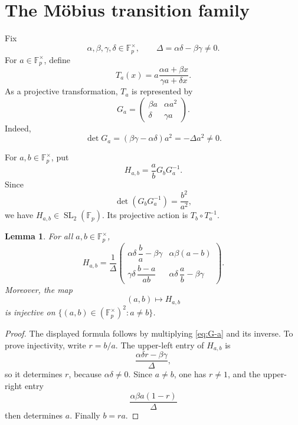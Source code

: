 \documentclass[11pt,reqno]{amsart}
\numberwithin{equation}{section}
\newtheorem{lemma}[lemma]{Lemma}
\theoremstyle{definition}
\theoremstyle{remark}
\newcommand{\F}{\mathbb F}
\newcommand{\SL}{\operatorname{SL}}
\begin{document}
\section{The M\"obius transition family}\label{sec:transitions}

Fix
\begin{equation}\label{eq:coeff-assumptions}
  \alpha,\beta,\gamma,\delta\in\F_p^\times,
  \qquad
  \Delta=\alpha\delta-\beta\gamma\ne0.
\end{equation}
For $a\in\F_p^\times$, define
\begin{equation}\label{eq:T-def}
  T_a(x)=a\frac{\alpha a+\beta x}{\gamma a+\delta x}.
\end{equation}
As a projective transformation, $T_a$ is represented by
\begin{equation}\label{eq:G-a}
  G_a=
  \begin{pmatrix}
    \beta a&\alpha a^2\\
    \delta&\gamma a
  \end{pmatrix}.
\end{equation}
Indeed,
\[
  \det G_a=(\beta\gamma-\alpha\delta)a^2=-\Delta a^2\ne0.
\]

For $a,b\in\F_p^\times$, put
\begin{equation}\label{eq:H-def}
  H_{a,b}=\frac abG_bG_a^{-1}.
\end{equation}
Since
\[
  \det(G_bG_a^{-1})=\frac{b^2}{a^2},
\]
we have $H_{a,b}\in\SL_2(\F_p)$.  Its projective action is $T_b\circ T_a^{-1}$.

\begin{lemma}\label{lem:H-formula}
For all $a,b\in\F_p^\times$,
\begin{equation}\label{eq:H-formula}
  H_{a,b}
  =\frac1\Delta
  \begin{pmatrix}
    \alpha\delta\,\dfrac ba-\beta\gamma
    &\alpha\beta(a-b)\\[3mm]
    \gamma\delta\,\dfrac{b-a}{ab}
    &\alpha\delta\,\dfrac ab-\beta\gamma
  \end{pmatrix}.
\end{equation}
Moreover, the map
\[
  (a,b)\longmapsto H_{a,b}
\]
is injective on $\{(a,b)\in(\F_p^\times)^2:a\ne b\}$.
\end{lemma}

\begin{proof}
The displayed formula follows by multiplying \eqref{eq:G-a} and its inverse.  To prove injectivity, write $r=b/a$.  The upper-left entry of $H_{a,b}$ is
\[
  \frac{\alpha\delta r-\beta\gamma}{\Delta},
\]
so it determines $r$, because $\alpha\delta\ne0$.  Since $a\ne b$, one has $r\ne1$, and the upper-right entry
\[
  \frac{\alpha\beta a(1-r)}{\Delta}
\]
then determines $a$.  Finally $b=ra$.
\end{proof}
\end{document}
